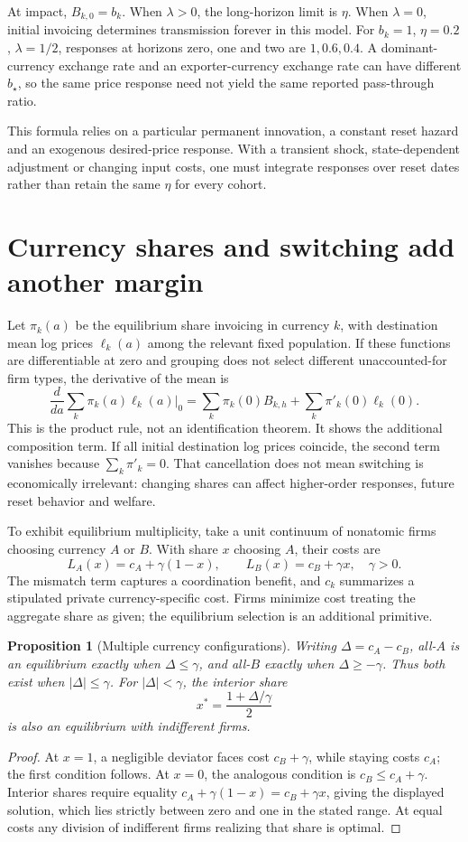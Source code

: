 \documentclass[11pt,a4paper]{article}
\newtheorem{proposition}[theorem]{Proposition}
\begin{document}
At impact, $B_{k,0}=b_k$. When $\lambda>0$, the long-horizon limit is $\eta$. When $\lambda=0$, initial invoicing determines transmission forever in this model. For $b_k=1$, $\eta=0.2$, $\lambda=1/2$, responses at horizons zero, one and two are $1,0.6,0.4$. A dominant-currency exchange rate and an exporter-currency exchange rate can have different $b_\star$, so the same price response need not yield the same reported pass-through ratio.

This formula relies on a particular permanent innovation, a constant reset hazard and an exogenous desired-price response. With a transient shock, state-dependent adjustment or changing input costs, one must integrate responses over reset dates rather than retain the same $\eta$ for every cohort.

\section{Currency shares and switching add another margin}
Let $\pi_k(a)$ be the equilibrium share invoicing in currency $k$, with destination mean log prices $\ell_k(a)$ among the relevant fixed population. If these functions are differentiable at zero and grouping does not select different unaccounted-for firm types, the derivative of the mean is
\[
 \frac{d}{da}\sum_k\pi_k(a)\ell_k(a)\bigg|_0
 =\sum_k\pi_k(0)B_{k,h}+\sum_k\pi'_k(0)\ell_k(0). \tag{2}
\]
This is the product rule, not an identification theorem. It shows the additional composition term. If all initial destination log prices coincide, the second term vanishes because $\sum_k\pi'_k=0$. That cancellation does not mean switching is economically irrelevant: changing shares can affect higher-order responses, future reset behavior and welfare.

To exhibit equilibrium multiplicity, take a unit continuum of nonatomic firms choosing currency $A$ or $B$. With share $x$ choosing $A$, their costs are
\[
 L_A(x)=c_A+\gamma(1-x),\qquad
 L_B(x)=c_B+\gamma x,\quad\gamma>0. \tag{3}
\]
The mismatch term captures a coordination benefit, and $c_k$ summarizes a stipulated private currency-specific cost. Firms minimize cost treating the aggregate share as given; the equilibrium selection is an additional primitive.

\begin{proposition}[Multiple currency configurations]
Writing $\Delta=c_A-c_B$, all-$A$ is an equilibrium exactly when $\Delta\le\gamma$, and all-$B$ exactly when $\Delta\ge-\gamma$. Thus both exist when $|\Delta|\le\gamma$. For $|\Delta|<\gamma$, the interior share
\[
 x^*=\frac{1+\Delta/\gamma}{2}
\]
is also an equilibrium with indifferent firms.
\end{proposition}
\begin{proof}
At $x=1$, a negligible deviator faces cost $c_B+\gamma$, while staying costs $c_A$; the first condition follows. At $x=0$, the analogous condition is $c_B\le c_A+\gamma$. Interior shares require equality $c_A+\gamma(1-x)=c_B+\gamma x$, giving the displayed solution, which lies strictly between zero and one in the stated range. At equal costs any division of indifferent firms realizing that share is optimal.
\end{proof}
\end{document}
